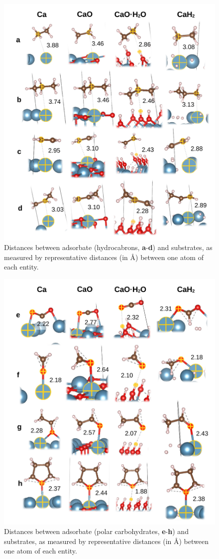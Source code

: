 \documentclass[journal=jpccck,manuscript=article]{achemso}
\begin{document}
\begin{figure}[!h]
	\centering
	\includegraphics[width=.7\linewidth]{Figure8}
	\caption{Distances between adsorbate (hydrocabrons, \textbf{a}-\textbf{d}) and substrates, as measured by representative distances (in \si{\angstrom}) between one atom of each entity.}
	\label{fig:distsad}
\end{figure}

\begin{figure}[!h]
\centering
\includegraphics[width=.7\linewidth]{Figure9}
\caption{Distances between adsorbate (polar carbohydrates, \textbf{e}-\textbf{h}) and substrates, as measured by representative distances (in \si{\angstrom}) between one atom of each entity.}
\label{fig:distseh}
\end{figure}
\end{document}
